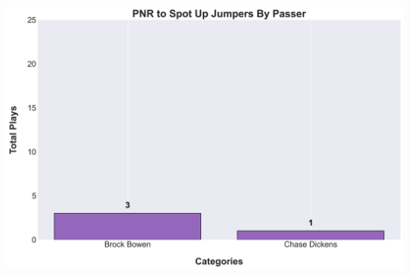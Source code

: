\documentclass[a4paper,12pt]{article}
\begin{document}
\begin{table}[H]
{\begin{minipage}[t]{0.6\textwidth}
{\begin{tabular}
            \bottomrule
        \end{tabular}
        } %
    \end{minipage}
    } %
    \hfill %
    \begin{minipage}[c]{0.35\textwidth} %
        \flushright
        \includegraphics[width=\textwidth, height=.14\textheight]{images/SpotUp_PNRShotsPlayer_Freq.png} %
    \end{minipage}
\end{table}

\vspace{-1em} %
\vspace{-1em} %
\end{document}
